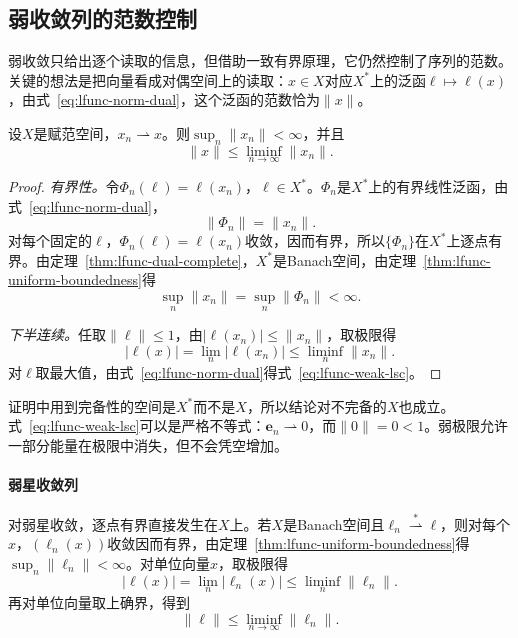 \subsection{弱收敛列的范数控制}
\label{sec:lfunc-weak-norm-control}

弱收敛只给出逐个读取的信息，但借助一致有界原理，它仍然控制了序列的范数。关键的想法是把向量看成对偶空间上的读取：$x\in X$对应$X^*$上的泛函$\ell\mapsto\ell(x)$，由式~\eqref{eq:lfunc-norm-dual}，这个泛函的范数恰为$\lVert x\rVert$。

\begin{theorem}[弱收敛列有界且范数下半连续]
\label{thm:lfunc-weak-bounded}
设$X$是赋范空间，$x_n\rightharpoonup x$。则$\sup_n\lVert x_n\rVert<\infty$，并且
\begin{equation}
\lVert x\rVert\leq\liminf_{n\to\infty}\lVert x_n\rVert .
\label{eq:lfunc-weak-lsc}
\end{equation}
\end{theorem}

\begin{proof}
\emph{有界性。}令$\Phi_n(\ell)=\ell(x_n)$，$\ell\in X^*$。$\Phi_n$是$X^*$上的有界线性泛函，由式~\eqref{eq:lfunc-norm-dual}，
\[
\lVert\Phi_n\rVert=\lVert x_n\rVert .
\]
对每个固定的$\ell$，$\Phi_n(\ell)=\ell(x_n)$收敛，因而有界，所以$\{\Phi_n\}$在$X^*$上逐点有界。由定理~\ref{thm:lfunc-dual-complete}，$X^*$是Banach空间，由定理~\ref{thm:lfunc-uniform-boundedness}得
\[
\sup_n\lVert x_n\rVert=\sup_n\lVert\Phi_n\rVert<\infty .
\]

\emph{下半连续。}任取$\lVert\ell\rVert\leq1$，由$\lvert\ell(x_n)\rvert\leq\lVert x_n\rVert$，取极限得
\[
\lvert\ell(x)\rvert=\lim_n\lvert\ell(x_n)\rvert\leq\liminf_n\lVert x_n\rVert .
\]
对$\ell$取最大值，由式~\eqref{eq:lfunc-norm-dual}得式~\eqref{eq:lfunc-weak-lsc}。
\end{proof}

证明中用到完备性的空间是$X^*$而不是$X$，所以结论对不完备的$X$也成立。式~\eqref{eq:lfunc-weak-lsc}可以是严格不等式：$\bm e_n\rightharpoonup0$，而$\lVert0\rVert=0<1$。弱极限允许一部分能量在极限中消失，但不会凭空增加。

\paragraph{弱星收敛列}
对弱星收敛，逐点有界直接发生在$X$上。若$X$是Banach空间且$\ell_n\overset{*}{\rightharpoonup}\ell$，则对每个$x$，$(\ell_n(x))$收敛因而有界，由定理~\ref{thm:lfunc-uniform-boundedness}得$\sup_n\lVert\ell_n\rVert<\infty$。对单位向量$x$，取极限得
\[
\lvert\ell(x)\rvert=\lim_n\lvert\ell_n(x)\rvert\leq\liminf_n\lVert\ell_n\rVert .
\]
再对单位向量取上确界，得到
\[
\lVert\ell\rVert\leq\liminf_{n\to\infty}\lVert\ell_n\rVert .
\]

